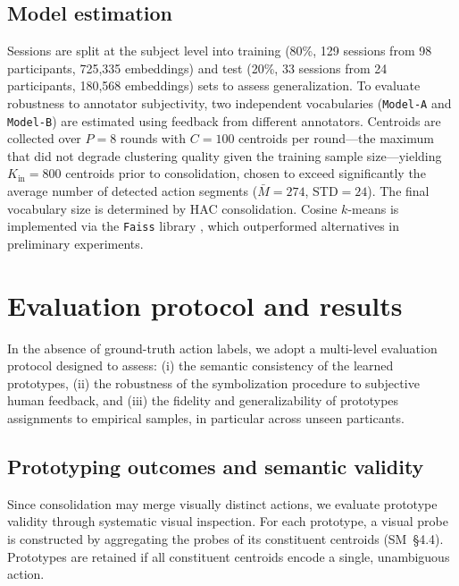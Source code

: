 \documentclass[runningheads]{llncs}
\begin{document}
    \subsection{Model estimation}

    Sessions are split at the subject level into training (80\%, 129 sessions from 98 participants, 725,335 embeddings) and test (20\%, 33 sessions from 24 participants, 180,568 embeddings) sets to assess generalization. To evaluate robustness to annotator subjectivity, two independent vocabularies (\texttt{Model-A} and \texttt{Model-B}) are estimated using feedback from different annotators. Centroids are collected over $P=8$ rounds with $C=100$ centroids per round---the maximum that did not degrade clustering quality given the training sample size---yielding $K_{\text{in}}=800$ centroids prior to consolidation, chosen to exceed significantly the average number of detected action segments ($\bar{M}=274$, STD$=24$). The final vocabulary size is determined by HAC consolidation. Cosine $k$-means is implemented via the \texttt{Faiss} library \cite{douze2024faiss}, which outperformed alternatives in preliminary experiments.
\vspace{-0.2cm}
\section{Evaluation protocol and results}
\label{sec:chapter_5_evaluation_protocol}

    In the absence of ground-truth action labels, we adopt a multi-level evaluation protocol designed to assess: 
    (i) the semantic consistency of the learned prototypes, 
    (ii) the robustness of the symbolization procedure to subjective human feedback, and (iii) the fidelity and generalizability of prototypes assignments to empirical samples, in particular across unseen particants.

    \subsection{Prototyping outcomes and semantic validity}

    Since consolidation may merge visually distinct actions, we evaluate prototype validity through systematic visual inspection. For each prototype, a visual probe is constructed by aggregating the probes of its constituent centroids (SM~\S4.4). Prototypes are retained if all constituent centroids encode a single, unambiguous action. 
\end{document}
